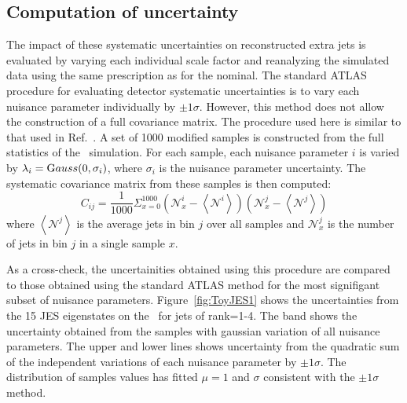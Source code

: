 \subsection{Computation of uncertainty}
\label{ss:systoy}
The impact of these systematic uncertainties on reconstructed extra jets is evaluated by varying each individual scale factor and reanalyzing the simulated data using the same prescription as for the nominal. The standard ATLAS procedure for evaluating detector systematic uncertainties is to vary each nuisance parameter individually by $\pm 1\sigma$. However, this method does not allow the construction of a full covariance matrix. The procedure used here is similar to that used in Ref.~\cite{Bell:1470588}. A set of 1000 modified samples is constructed from the full statistics of the \powpy\ simulation. For each sample, each nuisance parameter $i$ is varied by $\lambda_i ={\textrm Gauss}(0, \sigma_i)$, where $\sigma_i$ is the nuisance parameter uncertainty. The systematic covariance matrix from these samples is then computed:
\begin{equation}
C_{ij}=\frac{1}{1000} \Sigma_{x=0}^{1000} \left({\mathscr N}_x^i- \left \langle{\mathscr N}^i \right \rangle \right) \left({\mathscr N}_x^j- \left \langle{\mathscr N}^j \right \rangle \right)
\label{eqn:cov}
\end{equation}
where $\left \langle{\mathscr N}^j \right \rangle$ is the average jets in bin $j$ over all samples and ${\mathscr N}_x^j$ is the number of jets in bin $j$ in a single sample $x$. 

As a cross-check, the uncertainities obtained using this procedure are compared to those obtained using the standard ATLAS method for the most signifigant subset of nuisance parameters. Figure~\ref{fig:ToyJES1} shows the uncertainties from the 15 JES eigenstates on the \pt\ for jets of rank=1-4. The band shows the uncertainty obtained from the samples with gaussian variation of all nuisance parameters. The upper and lower lines shows uncertainty from the quadratic sum of the independent variations of each nuisance parameter by $\pm 1 \sigma$. The distribution of samples values has fitted $\mu=1$ and $\sigma$ consistent with the $\pm 1 \sigma$ method.





